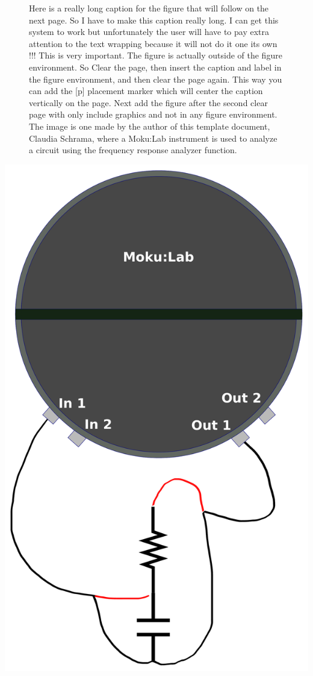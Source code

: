 \clearpage

\begin{figure}[p]
    \centering
    \caption{Here is a really long caption for the figure that will follow on the next page. So I have to make this caption really long. I can get this system to work but unfortunately the user will have to pay extra attention to the text wrapping because it will not do it one its own !!! This is very important. The figure is actually outside of the figure environment. So Clear the page, then insert the caption and label in the figure environment, and then clear the page again. This way you can add the [p] placement marker which will center the caption vertically on the page. Next add the figure after the second clear page with only include graphics and not in any figure environment. The image is one made by the author of this template document, Claudia Schrama, where a Moku:Lab instrument is used to analyze a circuit using the frequency response analyzer function. }
    \label{fig:WayToBig}
\end{figure}

\clearpage

\vspace*{\fill}
\begin{center}
    \includegraphics[height =0.9 \textheight]{figures/20120-04-16-YoutubeLiquidInstuments.pdf}
\end{center}
\vspace*{\fill}

\clearpage



